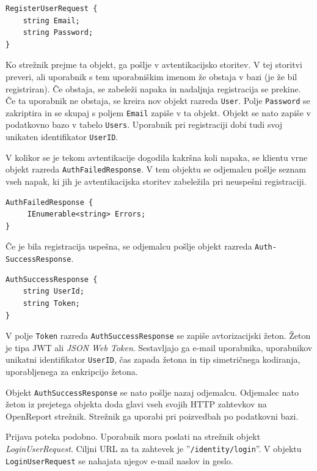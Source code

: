 \documentclass[a4paper, 12pt]{book}
\begin{document}
\begin{verbatim}
RegisterUserRequest {
    string Email; 
    string Password; 
} 
\end{verbatim}


Ko strežnik prejme ta objekt, ga pošlje v avtentikacijsko storitev.
V tej storitvi preveri, ali uporabnik s tem uporabniškim imenom že obstaja v bazi (je že bil registriran).
Če obstaja, se zabeleži napaka in nadaljnja registracija se prekine.
Če ta uporabnik ne obstaja, se kreira nov objekt razreda \texttt{User}.
Polje \texttt{Password} se zakriptira in se skupaj s poljem \texttt{Email} zapiše v ta objekt.
Objekt se nato zapiše v podatkovno bazo v tabelo \texttt{Users}.
Uporabnik pri registraciji dobi tudi svoj unikaten identifikator \texttt{UserID}.

V kolikor se je tekom avtentikacije dogodila kakršna koli napaka, se klientu vrne objekt razreda \texttt{AuthFailedResponse}.
V tem objektu se odjemalcu pošlje seznam vseh napak, ki jih je avtentikacijska storitev zabeležila pri neuspešni registraciji. 

\begin{verbatim}
AuthFailedResponse { 
     IEnumerable<string> Errors; 
}
\end{verbatim}


Če je bila registracija uspešna, se odjemalcu pošlje objekt razreda \texttt{Auth-\\SuccessResponse}.

\begin{verbatim}
AuthSuccessResponse { 
    string UserId; 
    string Token; 
} 
\end{verbatim}


\noindent V polje \texttt{Token} razreda \texttt{AuthSuccessResponse} se zapiše avtorizacijski žeton.
Žeton je tipa JWT ali \textit{JSON Web Token}.
Sestavljajo ga e-mail uporabnika, uporabnikov unikatni identifikator \texttt{UserID}, čas zapada žetona in tip simetričnega kodiranja, uporabljenega za enkripcijo žetona.

Objekt \texttt{AuthSuccessResponse} se nato pošlje nazaj odjemalcu.
Odjemalec nato žeton iz prejetega objekta doda glavi vseh svojih HTTP zahtevkov na OpenReport strežnik.
Strežnik ga uporabi pri poizvedbah po podatkovni bazi.

Prijava poteka podobno.
Uporabnik mora poslati na strežnik objekt \textit{LoginUserRequest}.
Ciljni URL za ta zahtevek je ''\texttt{/identity/login}''.
V objektu \texttt{LoginUserRequest} se nahajata njegov e-mail naslov in geslo.
\end{document}
